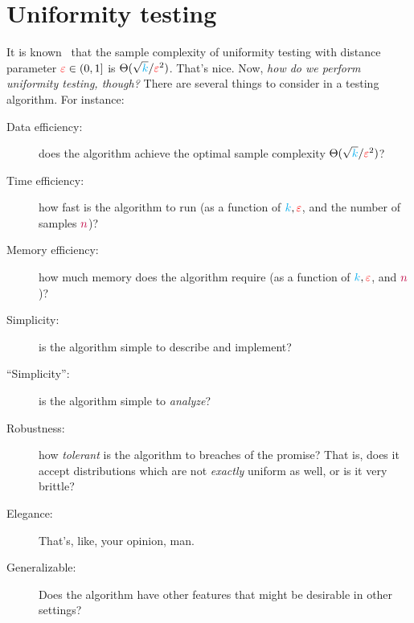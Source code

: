 \section{Uniformity testing}

It is known~\citep{Paninski08} that the sample complexity of uniformity testing with distance parameter $\textcolor{red}{\varepsilon}\in(0,1]$ is $\Theta(\sqrt{{\textcolor{cyan}{k}}}/\textcolor{red}{\varepsilon}^2)$. That's nice. Now, \emph{how do we perform uniformity testing, though?} 
There are several things to consider in a testing algorithm. For instance:
\begin{description}
  \item[Data efficiency:] does the algorithm achieve the optimal sample complexity $\Theta(\sqrt{{\textcolor{cyan}{k}}}/\textcolor{red}{\varepsilon}^2)$?
  \item[Time efficiency:] how fast is the algorithm to run (as a function of ${\textcolor{cyan}{k}},\textcolor{red}{\varepsilon}$, and the number of samples ${\textcolor{purple}{n}}$)?
  \item[Memory efficiency:] how much memory does the algorithm require (as a function of ${\textcolor{cyan}{k}},\textcolor{red}{\varepsilon}$, and ${\textcolor{purple}{n}}$)?
  \item[Simplicity:] is the algorithm simple to describe and implement?
  \item[``Simplicity'':] is the algorithm simple to \emph{analyze}?
  \item[Robustness:] how \emph{tolerant} is the algorithm to breaches of the promise? That is, does it accept distributions which are not \emph{exactly} uniform as well, or is it very brittle?
  \item[Elegance:] That's, like, your opinion, man.
  \item[Generalizable:] Does the algorithm have other features that might be desirable in other settings?
\end{description}

